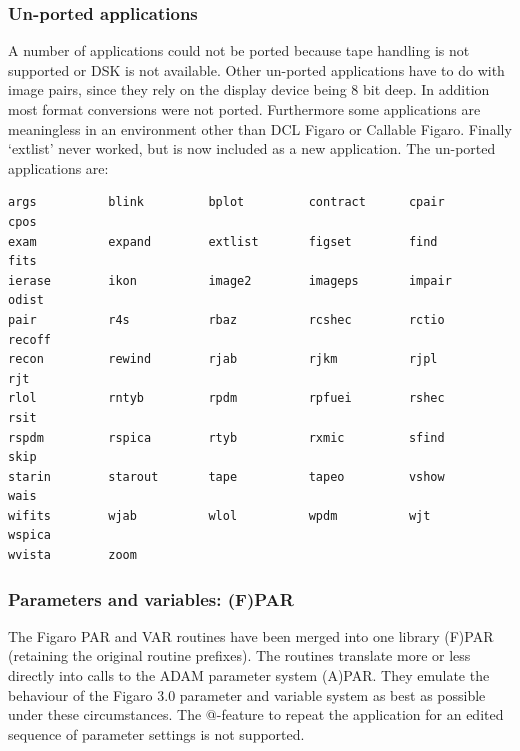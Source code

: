 
\subsubsection{\label{changessub4}Un-ported applications}

   A number of applications could not be ported because tape handling is
   not supported or DSK is not available.  Other un-ported applications
   have to do with image pairs, since they rely on the display device
   being 8 bit deep.  In addition most format conversions were not
   ported. Furthermore some applications are meaningless in an
   environment other than DCL Figaro or Callable Figaro.  Finally
   `extlist' never worked, but is now included as a new application. The
   un-ported applications are:

\begin{verbatim}
args          blink         bplot         contract      cpair         cpos
exam          expand        extlist       figset        find          fits
ierase        ikon          image2        imageps       impair        odist
pair          r4s           rbaz          rcshec        rctio         recoff
recon         rewind        rjab          rjkm          rjpl          rjt
rlol          rntyb         rpdm          rpfuei        rshec         rsit
rspdm         rspica        rtyb          rxmic         sfind         skip
starin        starout       tape          tapeo         vshow         wais
wifits        wjab          wlol          wpdm          wjt           wspica
wvista        zoom
\end{verbatim}


\subsubsection{\label{changessub5}Parameters and variables: (F)PAR}

   The Figaro PAR and VAR routines have been merged into one library
   (F)PAR (retaining the original routine prefixes). The routines
   translate more or less directly into calls to the ADAM parameter
   system (A)PAR. They emulate the behaviour of the Figaro 3.0 parameter
   and variable system as best as possible under these circumstances.
   The @-feature to repeat the application for an edited sequence of
   parameter settings is not supported.

